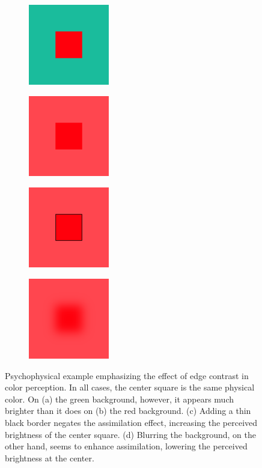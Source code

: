\documentclass[journal,onecolumn]{IEEEtran}
\begin{document}
\begin{figure}[H]
    \centering
    \begin{subfigure}{0.25\textwidth}
        \centering
        \includegraphics[width=100pt]{example_1a}
    \end{subfigure}%
    \begin{subfigure}{0.25\textwidth}
        \centering
        \includegraphics[width=100pt]{example_1b}
    \end{subfigure}%
    \begin{subfigure}{0.25\textwidth}
        \centering
        \includegraphics[width=100pt]{example_1c}
    \end{subfigure}%
    \begin{subfigure}{0.25\textwidth}
        \centering
        \includegraphics[width=100pt]{example_1d}
    \end{subfigure}%
    \caption{Psychophysical example emphasizing the effect of edge contrast in color perception. In all cases, the center square is the same physical color. On (a) the green background, however, it appears much brighter than it does on (b) the red background. (c) Adding a thin black border negates the assimilation effect, increasing the perceived brightness of the center square. (d) Blurring the background, on the other hand, seems to enhance assimilation, lowering the perceived brightness at the center.}
    \label{fig:blur-effect}
\end{figure}
\end{document}
